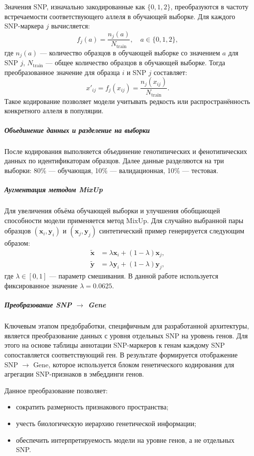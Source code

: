 Значения SNP, изначально закодированные как \(\{0, 1, 2\}\), преобразуются в частоту встречаемости соответствующего аллеля в обучающей выборке. Для каждого SNP-маркера \(j\) вычисляется:
\[
f_{j}(a) = \frac{n_{j}(a)}{N_{\text{train}}}, \quad a \in \{0, 1, 2\},
\]
где \(n_{j}(a)\) — количество образцов в обучающей выборке со значением \(a\) для SNP \(j\), \(N_{\text{train}}\) — общее количество образцов в обучающей выборке. Тогда преобразованное значение для образца \(i\) и SNP \(j\) составляет:
\[
x'_{ij} = f_{j}(x_{ij}) = \frac{n_{j}(x_{ij})}{N_{\text{train}}}.
\]
Такое кодирование позволяет модели учитывать редкость или распространённость конкретного аллеля в популяции.

\subparagraph{Объединение данных и разделение на выборки}

После кодирования выполняется объединение генотипических и фенотипических данных по идентификаторам образцов. Далее данные разделяются на три выборки: 80\% — обучающая, 10\% — валидационная, 10\% — тестовая.

\subparagraph{Аугментация методом MixUp}

Для увеличения объёма обучающей выборки и улучшения обобщающей способности модели применяется метод MixUp. Для случайно выбранной пары образцов \(( \mathbf{x}_i, \mathbf{y}_i )\) и \(( \mathbf{x}_j, \mathbf{y}_j )\) синтетический пример генерируется следующим образом:
\[
\begin{aligned}
	\tilde{\mathbf{x}} &= \lambda \mathbf{x}_i + (1 - \lambda) \mathbf{x}_j, \\
	\tilde{\mathbf{y}} &= \lambda \mathbf{y}_i + (1 - \lambda) \mathbf{y}_j,
\end{aligned}
\]
где \(\lambda \in [0, 1]\) — параметр смешивания. В данной работе используется фиксированное значение \(\lambda = 0.0625\).

\subparagraph{Преобразование SNP $\rightarrow$ Gene}

Ключевым этапом предобработки, специфичным для разработанной архитектуры, является преобразование данных с уровня отдельных SNP на уровень генов. Для этого на основе таблицы аннотации SNP-маркеров к генам каждому SNP сопоставляется соответствующий ген. В результате формируется отображение SNP $\rightarrow$ Gene, которое используется блоком генетического кодирования для агрегации SNP-признаков в эмбеддинги генов.

Данное преобразование позволяет:
\begin{itemize}
	\item сократить размерность признакового пространства;
	\item учесть биологическую иерархию генетической информации;
	\item обеспечить интерпретируемость модели на уровне генов, а не отдельных SNP.
\end{itemize}

